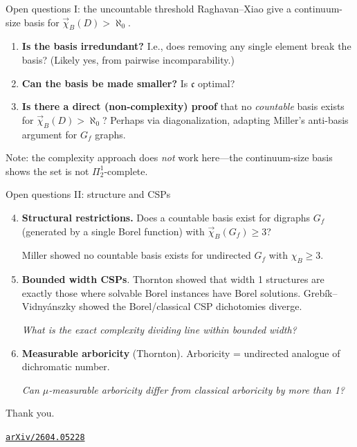 \documentclass[aspectratio=169, 12pt]{beamer}
\newcommand{\vchi}{\vec{\chi}_B}
\begin{document}

\begin{frame}{Open questions I: the uncountable threshold}
Raghavan--Xiao give a continuum-size basis for $\vchi(D) > \aleph_0$.

\medskip

\begin{enumerate}
	\item[\textbf{Q1.}] \textbf{Is the basis irredundant?} I.e., does removing any single element break the basis? (Likely yes, from pairwise incomparability.)

	\bigskip

	\item[\textbf{Q2.}] \textbf{Can the basis be made smaller?} Is $\mathfrak{c}$ optimal?

	\bigskip

	\item[\textbf{Q3.}] \textbf{Is there a direct (non-complexity) proof} that no \emph{countable} basis exists for $\vchi(D) > \aleph_0$? Perhaps via diagonalization, adapting Miller's anti-basis argument for $G_f$ graphs.
\end{enumerate}

\medskip

\small
Note: the complexity approach does \emph{not} work here---the continuum-size basis shows the set is not $\Pi^1_2$-complete.
\end{frame}

\begin{frame}{Open questions II: structure and CSPs}
\begin{enumerate}\setcounter{enumi}{3}
	\item[\textbf{Q4.}] \textbf{Structural restrictions.} Does a countable basis exist for digraphs $G_f$ (generated by a single Borel function) with $\vec\chi_B(G_f) \geq 3$?

	Miller showed no countable basis exists for undirected $G_f$ with $\chi_B \geq 3$.

	\bigskip

	\item[\textbf{Q5.}] \textbf{Bounded width CSPs}. Thornton showed that width 1 structures are exactly those where solvable Borel instances have Borel solutions. Grebík--Vidnyánszky showed the Borel/classical CSP dichotomies diverge.

	\emph{What is the exact complexity dividing line within bounded width?}

	\bigskip

	\item[\textbf{Q6.}] \textbf{Measurable arboricity} (Thornton). Arboricity = undirected analogue of dichromatic number.

	\emph{Can $\mu$-measurable arboricity differ from classical arboricity by more than 1?}
\end{enumerate}
\end{frame}

\begin{frame}{}
\begin{center}
	\Huge Thank you.

	\bigskip
	\large
	\texttt{\href{https://arxiv.org/abs/2604.05228}{arXiv/2604.05228}}
\end{center}
\end{frame}
\end{document}
